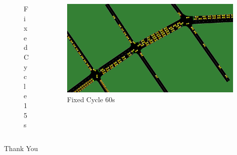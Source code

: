 \documentclass[dvipsnames]{beamer}
\begin{document}
\begin{frame}
\begin{columns}
\begin{column}{0.5\textwidth}
\begin{figure}
        \caption{Fixed Cycle 15s}
      \end{figure}
    \end{column}
    \begin{column}{0.5\textwidth}
      \begin{figure}
        \centering
        \includegraphics[width=1.00\textwidth]{figures/demo.fixed60.png}
        \caption{Fixed Cycle 60s}
      \end{figure}
    \end{column}
  \end{columns}
\end{frame}

\begin{frame}
\centering
\Huge
Thank You
\end{frame}
\end{document}
